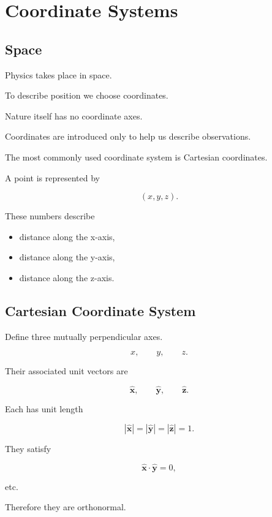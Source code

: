 \section{Coordinate Systems}
\label{sec:coordinate-systems}

\subsection{Space}

Physics takes place in space.

To describe position we choose coordinates.

Nature itself has no coordinate axes.

Coordinates are introduced only to help us describe observations.

The most commonly used coordinate system is Cartesian coordinates.

A point is represented by

\[
(x,y,z).
\]

These numbers describe

\begin{itemize}
	\item distance along the x-axis,
	\item distance along the y-axis,
	\item distance along the z-axis.
\end{itemize}


\subsection{Cartesian Coordinate System}

Define three mutually perpendicular axes.

\[
x,
\qquad
y,
\qquad
z.
\]

Their associated unit vectors are

\[
\hat{\mathbf x},
\qquad
\hat{\mathbf y},
\qquad
\hat{\mathbf z}.
\]

Each has unit length

\[
|\hat{\mathbf x}|=
|\hat{\mathbf y}|=
|\hat{\mathbf z}|=1.
\]

They satisfy

\[
\hat{\mathbf x}\cdot\hat{\mathbf y}=0,
\]

etc.

Therefore they are orthonormal.

